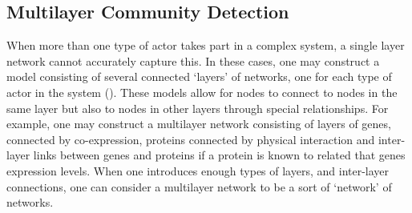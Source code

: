 \documentclass[
11pt, %
english, %
singlespacing, %
headsepline, %
]{MastersDoctoralThesis} %
\begin{document}


\subsection{Multilayer Community Detection}

When more than one type of actor takes part in a complex system, a single layer network cannot accurately capture this. In these cases, one may construct a model consisting of several connected `layers' of networks, one for each type of actor in the system (\cite{kivela2014multilayer}). These models allow for nodes to connect to nodes in the same layer but also to nodes in other layers through special relationships. For example, one may construct a multilayer network consisting of layers of genes, connected by co-expression, proteins connected by physical interaction and inter-layer links between genes and proteins if a protein is known to related that genes expression levels. When one introduces enough types of layers, and inter-layer connections, one can consider a multilayer network to be a sort of `network' of networks. 
\end{document}
